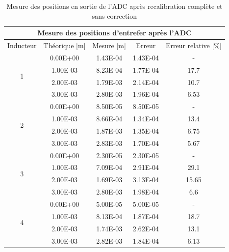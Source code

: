 \begin{table}[H]
    \centering
    \begin{tabular}{|c|c|c|c|c|}
        \hline
        \multicolumn{5}{|c|}{\textbf{Mesure des positions d'entrefer après l'ADC}}                    \\ \hline
        Inducteur          & Théorique {[}m{]} & Mesure {[}m{]} & Erreur   & Erreur relative {[}\%{]} \\ \hline
        \multirow{4}{*}{1} & 0.00E+00          & 1.43E-04       & 1.43E-04 & -                        \\ \cline{2-5}
                           & 1.00E-03          & 8.23E-04       & 1.77E-04 & 17.7                     \\ \cline{2-5}
                           & 2.00E-03          & 1.79E-03       & 2.14E-04 & 10.7                     \\ \cline{2-5}
                           & 3.00E-03          & 2.80E-03       & 1.96E-04 & 6.53                     \\ \hline
        \multirow{4}{*}{2} & 0.00E+00          & 8.50E-05       & 8.50E-05 & -                        \\ \cline{2-5}
                           & 1.00E-03          & 8.66E-04       & 1.34E-04 & 13.4                     \\ \cline{2-5}
                           & 2.00E-03          & 1.87E-03       & 1.35E-04 & 6.75                     \\ \cline{2-5}
                           & 3.00E-03          & 2.83E-03       & 1.70E-04 & 5.67                     \\ \hline
        \multirow{4}{*}{3} & 0.00E+00          & 2.30E-05       & 2.30E-05 & -                        \\ \cline{2-5}
                           & 1.00E-03          & 7.09E-04       & 2.91E-04 & 29.1                     \\ \cline{2-5}
                           & 2.00E-03          & 1.69E-03       & 3.13E-04 & 15.65                    \\ \cline{2-5}
                           & 3.00E-03          & 2.80E-03       & 1.98E-04 & 6.6                      \\ \hline
        \multirow{4}{*}{4} & 0.00E+00          & 5.00E-05       & 5.00E-05 & -                        \\ \cline{2-5}
                           & 1.00E-03          & 8.13E-04       & 1.87E-04 & 18.7                     \\ \cline{2-5}
                           & 2.00E-03          & 1.74E-03       & 2.62E-04 & 13.1                     \\ \cline{2-5}
                           & 3.00E-03          & 2.82E-03       & 1.84E-04 & 6.13                     \\ \hline
    \end{tabular}
    \caption{Mesure des positions en sortie de l'ADC après recalibration complète et sans correction}
    \label{tab:recalib_sans_correction_adc}
\end{table}

